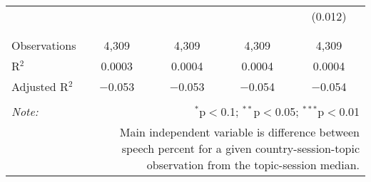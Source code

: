 \begin{table}[!htbp]
\begin{tabular}{@{\extracolsep{5pt}}lcccc}
  &  &  &  & (0.012) \\ 
  & & & & \\ 
\hline \\[-1.8ex] 
Observations & 4,309 & 4,309 & 4,309 & 4,309 \\ 
R$^{2}$ & 0.0003 & 0.0004 & 0.0004 & 0.0004 \\ 
Adjusted R$^{2}$ & $-$0.053 & $-$0.053 & $-$0.054 & $-$0.054 \\ 
\hline 
\hline \\[-1.8ex] 
\textit{Note:}  & \multicolumn{4}{r}{$^{*}$p$<$0.1; $^{**}$p$<$0.05; $^{***}$p$<$0.01} \\ 
 & \multicolumn{4}{r}{Main independent variable is difference between speech percent for a given country-session-topic observation from the topic-session median.} \\ 
\end{tabular} 
\end{table} 

